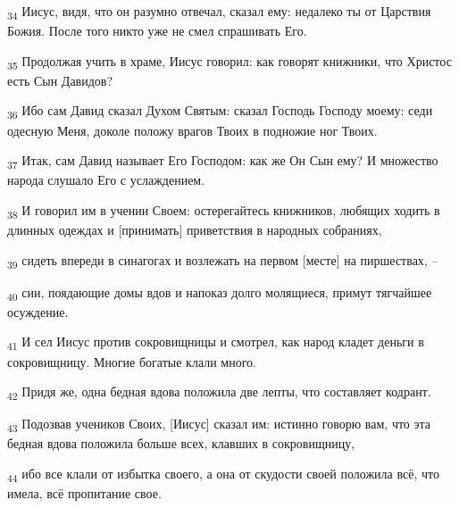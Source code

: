\begin{tcolorbox}
\textsubscript{34} Иисус, видя, что он разумно отвечал, сказал ему: недалеко ты от Царствия Божия. После того никто уже не смел спрашивать Его.
\end{tcolorbox}
\begin{tcolorbox}
\textsubscript{35} Продолжая учить в храме, Иисус говорил: как говорят книжники, что Христос есть Сын Давидов?
\end{tcolorbox}
\begin{tcolorbox}
\textsubscript{36} Ибо сам Давид сказал Духом Святым: сказал Господь Господу моему: седи одесную Меня, доколе положу врагов Твоих в подножие ног Твоих.
\end{tcolorbox}
\begin{tcolorbox}
\textsubscript{37} Итак, сам Давид называет Его Господом: как же Он Сын ему? И множество народа слушало Его с услаждением.
\end{tcolorbox}
\begin{tcolorbox}
\textsubscript{38} И говорил им в учении Своем: остерегайтесь книжников, любящих ходить в длинных одеждах и [принимать] приветствия в народных собраниях,
\end{tcolorbox}
\begin{tcolorbox}
\textsubscript{39} сидеть впереди в синагогах и возлежать на первом [месте] на пиршествах, --
\end{tcolorbox}
\begin{tcolorbox}
\textsubscript{40} сии, поядающие домы вдов и напоказ долго молящиеся, примут тягчайшее осуждение.
\end{tcolorbox}
\begin{tcolorbox}
\textsubscript{41} И сел Иисус против сокровищницы и смотрел, как народ кладет деньги в сокровищницу. Многие богатые клали много.
\end{tcolorbox}
\begin{tcolorbox}
\textsubscript{42} Придя же, одна бедная вдова положила две лепты, что составляет кодрант.
\end{tcolorbox}
\begin{tcolorbox}
\textsubscript{43} Подозвав учеников Своих, [Иисус] сказал им: истинно говорю вам, что эта бедная вдова положила больше всех, клавших в сокровищницу,
\end{tcolorbox}
\begin{tcolorbox}
\textsubscript{44} ибо все клали от избытка своего, а она от скудости своей положила всё, что имела, всё пропитание свое.
\end{tcolorbox}

